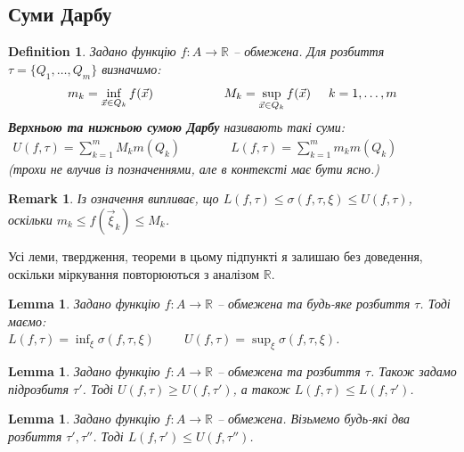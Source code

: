 \documentclass[a4paper, 10pt]{article}
\def\huge{\displaystyle}
\theoremstyle{theoremdd}
\theoremstyle{theoremdd}
\newtheorem{definition}[theorem]{Definition}
\theoremstyle{theoremdd}
\theoremstyle{theoremdd}
\theoremstyle{theoremdd}
\theoremstyle{theoremdd}
\theoremstyle{theoremdd}
\theoremstyle{theoremdd}
\theoremstyle{theoremdd}
\theoremstyle{theoremdd}
\theoremstyle{theoremdd}
\newtheorem{remark}[theorem]{Remark}
\theoremstyle{theoremdd}
\theoremstyle{theoremdd}
\newtheorem{lemma}[theorem]{Lemma}
\theoremstyle{theoremdd}
\theoremstyle{theoremdd}
\begin{document}
\subsection{Суми Дарбу}
\begin{definition}
Задано функцію $f \colon A \to \mathbb{R}$ -- обмежена. Для розбиття $\tau = \{Q_1,\dots,Q_m\}$ визначимо:
\begin{align*}
m_k = \inf_{\vec{x} \in Q_k} f(\vec{x}) \hspace{2cm} M_k = \sup_{\vec{x} \in Q_k} f(\vec{x}) \hspace{0.5cm} k=1,\dots,m
\end{align*}
\textbf{Верхньою та нижньою сумою Дарбу} називають такі суми:
\begin{align*}
U(f, \tau) = \sum_{k=1}^m M_k m(Q_k) \qquad\qquad L(f,\tau) = \sum_{k=1}^m m_k m(Q_k) \hspace{2cm}
\end{align*}
(трохи не влучив із позначеннями, але в контексті має бути ясно.)
\end{definition}

\begin{remark}
Із означення випливає, що $L(f,\tau) \leq \sigma(f,\tau,\xi) \leq U(f,\tau)$, оскільки $m_k \leq f(\vec{\xi}_k) \leq M_k$.
\end{remark}

Усі леми, твердження, теореми в цьому підпункті я залишаю без доведення, оскільки міркування повторюються з аналізом $\mathbb{R}$.

\begin{lemma}
Задано функцію $f \colon A \to \mathbb{R}$ -- обмежена та будь-яке розбиття $\tau$. Тоді маємо:\\
$L(f,\tau) = \huge\inf_{\xi} \sigma(f,\tau,\xi) \hspace{1cm} U(f,\tau) = \huge\sup_{\xi} \sigma(f,\tau,\xi)$.
\end{lemma}

\begin{lemma}
Задано функцію $f \colon A \to \mathbb{R}$ -- обмежена та розбиття $\tau$. Також задамо підрозбитя $\tau'$. Тоді $U(f,\tau) \geq U(f,\tau')$, а також $L(f,\tau) \leq L(f,\tau')$.
\end{lemma}

\begin{lemma}
Задано функцію $f \colon A \to \mathbb{R}$ -- обмежена. Візьмемо будь-які два розбиття $\tau', \tau''$. Тоді $L(f,\tau') \leq U(f,\tau'')$.
\end{lemma}
\end{document}
